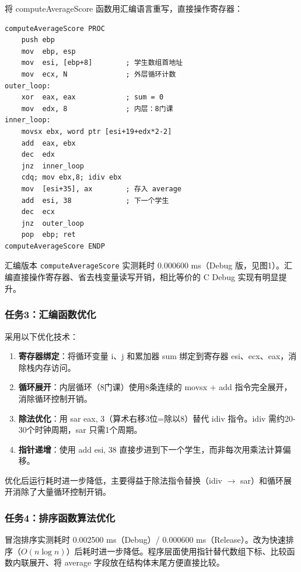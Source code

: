 \documentclass[12pt,a4paper]{ctexart}
\begin{document}
将 computeAverageScore 函数用汇编语言重写，直接操作寄存器：

\begin{lstlisting}
computeAverageScore PROC
    push ebp
    mov  ebp, esp
    mov  esi, [ebp+8]        ; 学生数组首地址
    mov  ecx, N              ; 外层循环计数
outer_loop:
    xor  eax, eax            ; sum = 0
    mov  edx, 8              ; 内层：8门课
inner_loop:
    movsx ebx, word ptr [esi+19+edx*2-2]
    add  eax, ebx
    dec  edx
    jnz  inner_loop
    cdq; mov ebx,8; idiv ebx
    mov  [esi+35], ax        ; 存入 average
    add  esi, 38             ; 下一个学生
    dec  ecx
    jnz  outer_loop
    pop  ebp; ret
computeAverageScore ENDP
\end{lstlisting}

汇编版本 \texttt{computeAverageScore} 实测耗时 0.000600 ms（Debug 版，见图1）。汇编直接操作寄存器、省去栈变量读写开销，相比等价的 C Debug 实现有明显提升。

\subsubsection*{任务3：汇编函数优化}

采用以下优化技术：
\begin{enumerate}[label=（\arabic*）,nosep]
    \item \textbf{寄存器绑定}：将循环变量 i、j 和累加器 sum 绑定到寄存器 esi、ecx、eax，消除栈内存访问。
    \item \textbf{循环展开}：内层循环（8门课）使用8条连续的 movsx + add 指令完全展开，消除循环控制开销。
    \item \textbf{除法优化}：用 sar eax, 3（算术右移3位=除以8）替代 idiv 指令。idiv 需约20-30个时钟周期，sar 只需1个周期。
    \item \textbf{指针递增}：使用 add esi, 38 直接步进到下一个学生，而非每次用乘法计算偏移。
\end{enumerate}

优化后运行耗时进一步降低，主要得益于除法指令替换（idiv $\to$ sar）和循环展开消除了大量循环控制开销。

\subsubsection*{任务4：排序函数算法优化}

冒泡排序实测耗时 0.002500 ms（Debug）/ 0.000600 ms（Release）。改为快速排序（$O(n \log n)$）后耗时进一步降低。程序层面使用指针替代数组下标、比较函数内联展开、将 average 字段放在结构体末尾方便直接比较。
\end{document}
